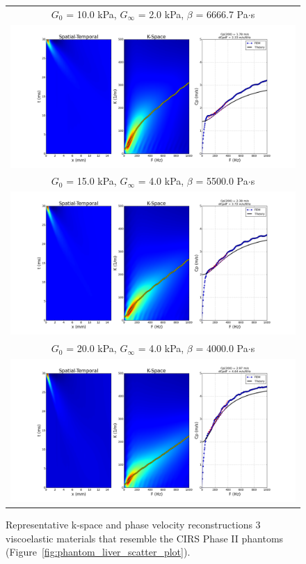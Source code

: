 \begin{figure}[htb!]
    \centering
    \begin{tabular}{c}
        $G_0$ = 10.0 kPa, $G_\infty$ = 2.0 kPa, $\beta$ = 6666.7 Pa$\cdot$s\\
        \includegraphics[width=0.75\linewidth]{figs/G010kPa_GI2kPa_BETA6667.png}\\
        $G_0$ = 15.0 kPa, $G_\infty$ = 4.0 kPa, $\beta$ = 5500.0 Pa$\cdot$s\\
        \includegraphics[width=0.75\linewidth]{figs/G015kPa_GI4kPa_BETA5500.png}\\
        $G_0$ = 20.0 kPa, $G_\infty$ = 4.0 kPa, $\beta$ = 4000.0 Pa$\cdot$s\\
        \includegraphics[width=0.75\linewidth]{figs/G020kPa_GI4kPa_BETA4000.png}\\
    \end{tabular}
    \caption{Representative k-space and phase velocity reconstructions 3
        viscoelastic materials that resemble the CIRS Phase II phantoms
        (Figure~\ref{fig:phantom_liver_scatter_plot}).}
\label{fig:ve_data}
\end{figure}


